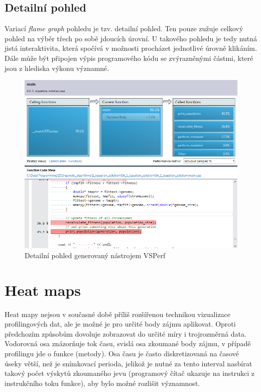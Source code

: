\documentclass[czech,BP]{thesiskiv}
\begin{document}
\subsection{Detailní pohled}

Variací \emph{flame graph} pohledu je tzv. detailní pohled. Ten pouze zužuje celkový pohled na výběr třech po sobě jdoucích úrovní. U takového pohledu je tedy nutná jistá interaktivita, která spočívá v možnosti procházet jednotlivé úrovně klikáním. Dále může být připojen výpis programového kódu se zvýrazněnými částmi, které jsou z hlediska výkonu významné.

\begin{figure}[h]
    \centering
    \includegraphics[interpolate,width=1.0\textwidth]{img/prof_detailgraph.png}
    \caption{Detailní pohled generovaný nástrojem VSPerf}
    \label{obr:detailview}
\end{figure}

\section {Heat maps}

Heat mapy nejsou v současné době příliš rozšířenou technikou vizualizace profilingových dat, ale je možné je pro určité body zájmu aplikovat. Oproti předchozím způsobům dovoluje zobrazovat do určité míry i trojrozměrná data. Vodorovná osa znázorňuje tok času, svislá osa zkoumané body zájmu, v případě profilingu jde o funkce (metody). Osa času je často diskretizovaná na časové úseky větší, než je snímkovací perioda, jelikož je nutné za tento interval nasbírat takový počet výskytů zkoumaného jevu (programový čítač ukazuje na instrukci z instrukčního toku funkce), aby bylo možné rozlišit významnost.
\end{document}

